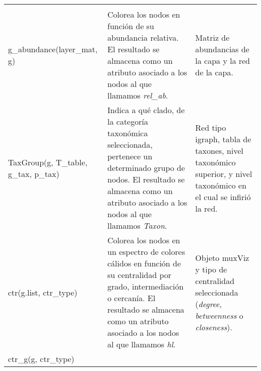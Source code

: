 \documentclass[
]{book}
\begin{document}
\begin{longtable}[]{@{}lll@{}}
\begin{minipage}[t]{0.35\columnwidth}
\end{minipage}\tabularnewline
\begin{minipage}[t]{0.35\columnwidth}\raggedright
g\_abundance(layer\_mat, g)\strut
\end{minipage} & \begin{minipage}[t]{0.22\columnwidth}\raggedright
Colorea los nodos en función de su abundancia relativa. El resultado se almacena como un atributo asociado a los nodos al que llamamos \emph{rel\_ab}.\strut
\end{minipage} & \begin{minipage}[t]{0.35\columnwidth}\raggedright
Matriz de abundancias de la capa y la red de la capa.\strut
\end{minipage}\tabularnewline
\begin{minipage}[t]{0.35\columnwidth}\raggedright
TaxGroup(g, T\_table, g\_tax, p\_tax)\strut
\end{minipage} & \begin{minipage}[t]{0.22\columnwidth}\raggedright
Indica a qué clado, de la categoría taxonómica seleccionada, pertenece un determinado grupo de nodos. El resultado se almacena como un atributo asociado a los nodos al que llamamos \emph{Taxon}.\strut
\end{minipage} & \begin{minipage}[t]{0.35\columnwidth}\raggedright
Red tipo igraph, tabla de taxones, nivel taxonómico superior, y nivel taxonómico en el cual se infirió la red.\strut
\end{minipage}\tabularnewline
\begin{minipage}[t]{0.35\columnwidth}\raggedright
ctr(g.list, ctr\_type)\strut
\end{minipage} & \begin{minipage}[t]{0.22\columnwidth}\raggedright
Colorea los nodos en un espectro de colores cálidos en función de su centralidad por grado, intermediación o cercanía. El resultado se almacena como un atributo asociado a los nodos al que llamamos \emph{hl}.\strut
\end{minipage} & \begin{minipage}[t]{0.35\columnwidth}\raggedright
Objeto muxViz y tipo de centralidad seleccionada (\emph{degree}, \emph{betweenness} o \emph{closeness}).\strut
\end{minipage}\tabularnewline
\begin{minipage}[t]{0.35\columnwidth}\raggedright
ctr\_g(g, ctr\_type)\strut
\end{minipage} & \begin{minipage}[t]{0.22\columnwidth}\raggedright

\end{minipage}
\end{longtable}
\end{document}
